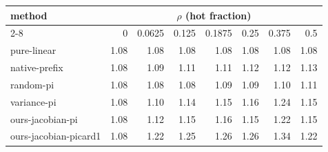 \begin{tabular}{lrrrrrrr}
\toprule
method & \multicolumn{7}{c}{$\rho$ (hot fraction)} \\
\cmidrule(lr){2-8}
 & 0 & 0.0625 & 0.125 & 0.1875 & 0.25 & 0.375 & 0.5 \\
\midrule
pure-linear & 1.08 & 1.08 & 1.08 & 1.08 & 1.08 & 1.08 & 1.08 \\
native-prefix & 1.08 & 1.09 & 1.11 & 1.11 & 1.12 & 1.12 & 1.13 \\
random-pi & 1.08 & 1.08 & 1.08 & 1.09 & 1.09 & 1.10 & 1.11 \\
variance-pi & 1.08 & 1.10 & 1.14 & 1.15 & 1.16 & 1.24 & 1.15 \\
ours-jacobian-pi & 1.08 & 1.12 & 1.15 & 1.16 & 1.15 & 1.22 & 1.15 \\
ours-jacobian-picard1 & 1.08 & 1.22 & 1.25 & 1.26 & 1.26 & 1.34 & 1.22 \\
\bottomrule
\end{tabular}
